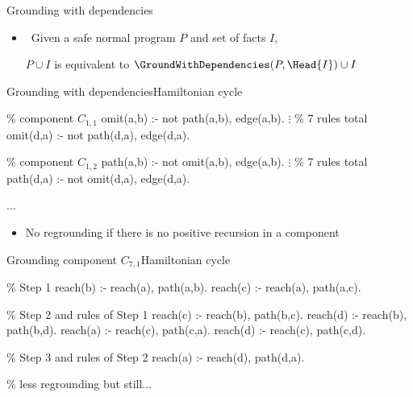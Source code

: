 \begin{frame}{Grounding with dependencies}
  \bigskip
  \begin{center}
  \end{center}
  \bigskip
  \begin{itemize}
  \item<2->  \ Given a safe normal program \(P\) and set of facts \(I\),

    \(P \cup I\) is equivalent to \(\GroundWithDependencies(P,\Head{I}) \cup I\)
  \end{itemize}
\end{frame}
\begin{frame}{Grounding with dependencies}{Hamiltonian cycle}
\begin{SemiVerbatim}{.9}
{\color{comment}\% component \(C_{1,1}\)}
omit(a,b) :- not path(a,b), \alert{edge(a,b)}.
          \(\vdots\) {\color{comment}\% 7 rules total}
omit(d,a) :- not path(d,a), \alert{edge(d,a)}.

{\color{comment}\% component \(C_{1,2}\)}
path(a,b) :- not omit(a,b), \alert{edge(a,b)}.
          \(\vdots\) {\color{comment}\% 7 rules total}
path(d,a) :- not omit(d,a), \alert{edge(d,a)}.

...
\end{SemiVerbatim}
\vspace{-.8cm}
\begin{itemize}
\item<2-> No regrounding if there is no positive recursion in a component
\end{itemize}
\smallskip
\end{frame}
\begin{frame}{Grounding component \(C_{7,1}\)}{Hamiltonian cycle}
\begin{SemiVerbatim}{.9}
{\color{comment}\% Step 1}
reach(b) :- \alert{reach(a)}, \alert{path(a,b)}.
reach(c) :- \alert{reach(a)}, \alert{path(a,c)}.

{\color{comment}\% Step 2 \alert{and} rules of Step 1}
reach(c) :- \alert{reach(b)}, path(b,c).
reach(d) :- \alert{reach(b)}, path(b,d).
reach(a) :- \alert{reach(c)}, path(c,a).
reach(d) :- \alert{reach(c)}, path(c,d).

{\color{comment}\% Step 3 \alert{and} rules of Step 2}
reach(a) :- \alert{reach(d)}, path(d,a).

{\color{comment}\% less regrounding but still...}
\end{SemiVerbatim}
\end{frame}
%
